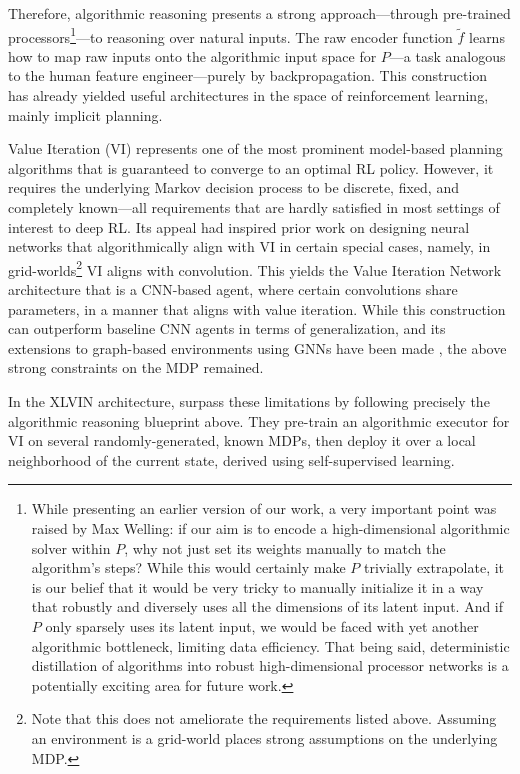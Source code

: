 \documentclass[twoside,11pt]{article}
\begin{document}
Therefore, algorithmic reasoning presents a strong approach---through pre-trained processors\footnote{While presenting an earlier version of our work, a very important point was raised by Max Welling: if our aim is to encode a high-dimensional algorithmic solver within $P$, why not just set its weights {manually} to match the algorithm's steps? While this would certainly make $P$ trivially extrapolate, it is our belief that it would be very tricky to manually initialize it in a way that {robustly} and {diversely} uses all the dimensions of its latent input. And if $P$ only sparsely uses its latent input, we would be faced with yet another algorithmic bottleneck, limiting data efficiency. That being said, deterministic distillation of algorithms into robust high-dimensional processor networks is a potentially exciting area for future work.}---to reasoning over natural inputs. The raw encoder function $\tilde{f}$ learns how to map raw inputs onto the algorithmic input space for $P$---a task analogous to the human feature engineer---purely by backpropagation. This construction has already yielded useful architectures in the space of reinforcement learning, mainly implicit planning.

Value Iteration (VI) represents one of the most prominent model-based planning algorithms that is guaranteed to converge to an optimal RL policy. However, it requires the underlying Markov decision process to be discrete, fixed, and completely known---all requirements that are hardly satisfied in most settings of interest to deep RL. Its appeal had inspired prior work on designing neural networks that algorithmically align with VI in certain special cases, namely, in grid-worlds\footnote{Note that this does not ameliorate the requirements listed above. Assuming an environment is a grid-world places strong assumptions on the underlying MDP.} VI aligns with convolution. This yields the Value Iteration Network architecture \citep[VIN]{tamar2016value} that is a CNN-based agent, where certain convolutions share parameters, in a manner that aligns with value iteration. While this construction can outperform baseline CNN agents in terms of generalization, and its extensions to graph-based environments using GNNs have been made \citep{niu2018generalized}, the above strong constraints on the MDP remained.

In the {XLVIN} architecture, \citet{Deac2020} surpass these limitations by following precisely the algorithmic reasoning blueprint above. They pre-train an algorithmic executor for VI on several randomly-generated, known MDPs, then deploy it over a local neighborhood of the current state, derived using self-supervised learning.
\end{document}
